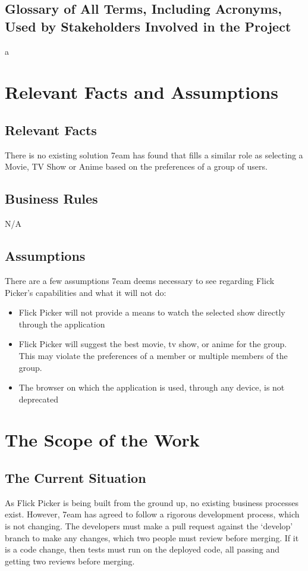 \documentclass[12pt]{article}
\begin{document}
\subsection{Glossary of All Terms, Including Acronyms, Used by Stakeholders Involved in the Project}
a

\section{Relevant Facts and Assumptions}

\subsection{Relevant Facts}
There is no existing solution 7eam has found that fills a similar role as selecting a Movie, TV Show or Anime based on the preferences of a group of users.


\subsection{Business Rules}
N/A

\subsection{Assumptions}
There are a few assumptions 7eam deems necessary to see regarding Flick Picker's capabilities and what it will not do:
\begin{itemize}
	\item Flick Picker will not provide a means to watch the selected show directly through the application
	\item Flick Picker will suggest the best movie, tv show, or anime for the group. This may violate the preferences of a member or multiple members of the group.
	\item The browser on which the application is used, through any device, is not deprecated
\end{itemize}

\section{The Scope of the Work}

\subsection{The Current Situation}
As Flick Picker is being built from the ground up, no existing business processes exist. However, 7eam has agreed to follow a rigorous development process, which is not changing. The developers must make a pull request against the `develop' branch to make any changes, which two people must review before merging. If it is a code change, then tests must run on the deployed code, all passing and getting two reviews before merging.
\end{document}
